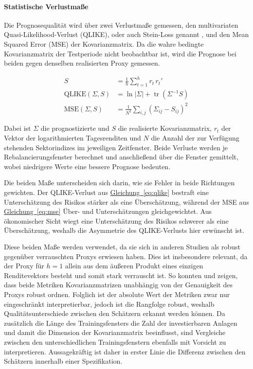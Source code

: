 \documentclass[12pt,a4paper]{article}
\begin{document}
\paragraph{Statistische Verlustmaße}
Die Prognosequalität wird über zwei Verlustmaße gemessen, den multivariaten Quasi-Likelihood-Verlust (QLIKE), oder auch Stein-Loss genannt \parencite{laurent2013}, und den Mean Squared Error (MSE) der Kovarianzmatrix.
Da die wahre bedingte Kovarianzmatrix der Testperiode nicht beobachtbar ist, wird die Prognose bei beiden gegen denselben realisierten Proxy gemessen.

\begin{align}
	\label{eq:proxy}
	S &= \frac{1}{h}\sum_{t=1}^{h} r_t\,r_t' \\
	\label{eq:qlike}
	\mathrm{QLIKE}(\Sigma, S) &= \ln|\Sigma| + \operatorname{tr}(\Sigma^{-1} S) \\
	\label{eq:mse}
	\mathrm{MSE}(\Sigma, S) &= \frac{1}{N^2}\sum_{i,j}\left(\Sigma_{ij} - S_{ij}\right)^2
\end{align}

Dabei ist $\Sigma$ die prognostizierte und $S$ die realisierte Kovarianzmatrix, $r_t$ der Vektor der logarithmierten Tagesrenditen und $N$ die Anzahl der zur Verfügung stehenden Sektorindizes im jeweiligen Zeitfenster.
Beide Verluste werden je Rebalancierungsfenster berechnet und anschließend über die Fenster gemittelt, wobei niedrigere Werte eine bessere Prognose bedeuten.

Die beiden Maße unterscheiden sich darin, wie sie Fehler in beide Richtungen gewichten.
Der QLIKE-Verlust aus \hyperref[eq:qlike]{Gleichung~\ref*{eq:qlike}} bestraft eine Unterschätzung des Risikos stärker als eine Überschätzung, während der MSE aus \hyperref[eq:mse]{Gleichung~\ref*{eq:mse}} Über- und Unterschätzungen gleichgewichtet.
Aus ökonomischer Sicht wiegt eine Unterschätzung des Risikos schwerer als eine Überschätzung, weshalb die Asymmetrie des QLIKE-Verlusts hier erwünscht ist.

Diese beiden Maße werden verwendet, da sie sich in anderen Studien als robust gegenüber verrauschten Proxys erwiesen haben.
Dies ist insbesondere relevant, da der Proxy für $h=1$ allein aus dem äußeren Produkt eines einzigen Renditevektors besteht und somit stark verrauscht ist.
So konnten \textcite{patton2011} und \textcite{laurent2013} zeigen, dass beide Metriken Kovarianzmatrizen unabhängig von der Genauigkeit des Proxys robust ordnen.
Folglich ist der absolute Wert der Metriken zwar nur eingeschränkt interpretierbar, jedoch ist die Rangfolge robust, weshalb Qualitätsunterschiede zwischen den Schätzern erkannt werden können.
Da zusätzlich die Länge des Trainingsfensters die Zahl der investierbaren Anlagen und damit die Dimension der Kovarianzmatrix beeinflusst, sind Vergleiche zwischen den unterschiedlichen Trainingsfenstern ebenfalls mit Vorsicht zu interpretieren.
Aussagekräftig ist daher in erster Linie die Differenz zwischen den Schätzern innerhalb einer Spezifikation.
\end{document}
